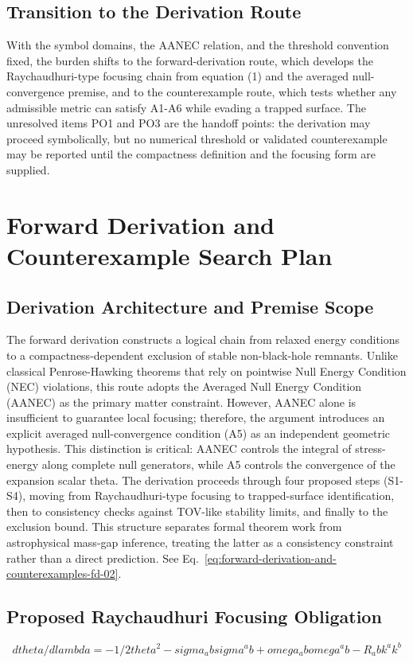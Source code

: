 \documentclass[conference]{IEEEtran}
\begin{document}
\subsection{Transition to the Derivation Route}
With the symbol domains, the AANEC relation, and the threshold convention fixed, the burden shifts to the forward-derivation route, which develops the Raychaudhuri-type focusing chain from equation (1) and the averaged null-convergence premise, and to the counterexample route, which tests whether any admissible metric can satisfy A1-A6 while evading a trapped surface. The unresolved items PO1 and PO3 are the handoff points: the derivation may proceed symbolically, but no numerical threshold or validated counterexample may be reported until the compactness definition and the focusing form are supplied.

\section{Forward Derivation and Counterexample Search Plan}
\subsection{Derivation Architecture and Premise Scope}
The forward derivation constructs a logical chain from relaxed energy conditions to a compactness-dependent exclusion of stable non-black-hole remnants. Unlike classical Penrose-Hawking theorems that rely on pointwise Null Energy Condition (NEC) violations, this route adopts the Averaged Null Energy Condition (AANEC) as the primary matter constraint. However, AANEC alone is insufficient to guarantee local focusing; therefore, the argument introduces an explicit averaged null-convergence condition (A5) as an independent geometric hypothesis. This distinction is critical: AANEC controls the integral of stress-energy along complete null generators, while A5 controls the convergence of the expansion scalar theta. The derivation proceeds through four proposed steps (S1-S4), moving from Raychaudhuri-type focusing to trapped-surface identification, then to consistency checks against TOV-like stability limits, and finally to the exclusion bound. This structure separates formal theorem work from astrophysical mass-gap inference, treating the latter as a consistency constraint rather than a direct prediction. See Eq.~\eqref{eq:forward-derivation-and-counterexamples-fd-02}.~\cite{cite_0ed84243cf171bc4}

\subsection{Proposed Raychaudhuri Focusing Obligation}
\begin{equation}
d theta / d lambda = - 1/2 theta^2 - sigma_ab sigma^ab + omega_ab omega^ab - R_ab k^a k^b
\label{eq:forward-derivation-and-counterexamples-fd-02}
\end{equation}
\end{document}
